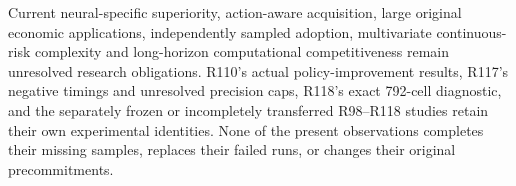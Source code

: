 Current neural-specific superiority, action-aware acquisition,
large original economic applications, independently sampled adoption,
multivariate continuous-risk complexity and long-horizon computational
competitiveness remain unresolved research obligations.  R110's actual
policy-improvement results, R117's negative timings and unresolved
precision caps, R118's exact 792-cell diagnostic, and the separately
frozen or incompletely transferred R98--R118 studies retain their own
experimental identities.  None of the present observations completes
their missing samples, replaces their failed runs, or changes their
original precommitments.
